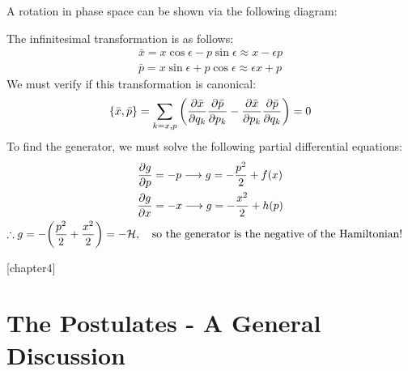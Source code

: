 \documentclass{report}
\theoremstyle{definition}
\newcounter{subpart1}[chapter1]
\begin{document}
\begin{chapter2}\label{prob: 20}
	A rotation in phase space can be shown via the following diagram: \\
		\begin{center}
		\end{center}
		The infinitesimal transformation is as follows:
		\begin{gather*}
			\bar x = x\cos\epsilon - p\sin\epsilon \approx x - \epsilon p \\
			\bar p = x\sin\epsilon + p\cos\epsilon \approx \epsilon x + p
		\end{gather*}
		We must verify if this transformation is canonical:
		\begin{gather*}
			\acomm{\bar x}{\bar p} = \sum_{k = x, p} \pqty{\pdv{\bar x}{q_k}\pdv{\bar p}{p_k} - \pdv{\bar x}{p_k}\pdv{\bar p}{q_k}} = 0
		\end{gather*}
		To find the generator, we must solve the following partial differential equations:
		\begin{gather*}
			\pdv{g}{p} = -p \longrightarrow g = -\frac{p^2}{2} + f(x) \\
			\pdv{g}{x} = -x \longrightarrow g = -\frac{x^2}{2} + h(p) \\
			\therefore g = -\pqty{\frac{p^2}{2} + \frac{x^2}{2}} = -\mathcal{H},\qq{so the generator is the negative of the Hamiltonian!}
		\end{gather*}
\end{chapter2}

\begin{chapter2}\label{prob: 11}
	
\end{chapter2}

\newtheorem{chapter4}{Exercise}
[chapter4]

\chapter{The Postulates - A General Discussion}
\end{document}
